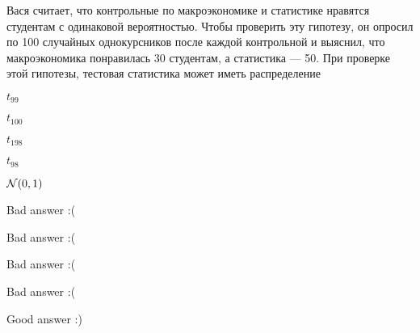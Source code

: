 
\begin{question}
Вася считает, что контрольные по макроэкономике и статистике нравятся
студентам с одинаковой вероятностью. Чтобы проверить эту гипотезу, он
опросил по 100 случайных однокурсников после каждой контрольной и
выяснил, что макроэкономика понравилась 30 студентам, а статистика ---
50. При проверке этой гипотезы, тестовая статистика может иметь
распределение
\begin{answerlist}
  \item \(t_{99}\)
  \item \(t_{100}\)
  \item \(t_{198}\)
  \item \(t_{98}\)
  \item \(\mathcal{N}(0,1)\)
\end{answerlist}
\end{question}

\begin{solution}
\begin{answerlist}
  \item Bad answer :(
  \item Bad answer :(
  \item Bad answer :(
  \item Bad answer :(
  \item Good answer :)
\end{answerlist}
\end{solution}

